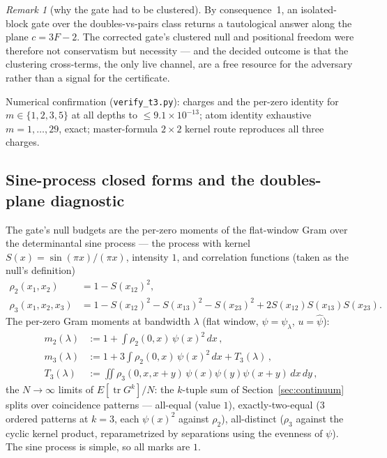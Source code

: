 \documentclass[11pt]{article}
\theoremstyle{plain}
\theoremstyle{definition}
\theoremstyle{remark}
\newtheorem*{remk}{Remark}
\newcommand{\tr}{\operatorname{tr}}
\begin{document}
\begin{remk}[why the gate had to be clustered]
By consequence~1, an isolated-block gate over the doubles-vs-pairs class returns
a tautological answer along the plane $c = 3F - 2$. The corrected gate's
clustered null and positional freedom were therefore not conservatism but
necessity --- and the decided outcome is that the clustering cross-terms, the
only live channel, are a free resource for the adversary rather than a signal for
the certificate.
\end{remk}

Numerical confirmation (\texttt{verify\_t3.py}): charges and the per-zero
identity for $m \in \{1, 2, 3, 5\}$ at all depths to $\le 9.1 \times 10^{-13}$;
atom identity exhaustive $m = 1, \ldots, 29$, exact; master-formula
$2 \times 2$ kernel route reproduces all three charges.

\subsection{Sine-process closed forms and the doubles-plane diagnostic}
\label{sec:sine}

The gate's null budgets are the per-zero moments of the flat-window Gram over the
determinantal sine process --- the process with kernel
$S(x) = \sin(\pi x)/(\pi x)$, intensity $1$, and correlation functions (taken as
the null's definition)
\begin{align*}
  \rho_2(x_1, x_2) &= 1 - S(x_{12})^2,\\
  \rho_3(x_1, x_2, x_3) &= 1 - S(x_{12})^2 - S(x_{13})^2 - S(x_{23})^2
    + 2 S(x_{12}) S(x_{13}) S(x_{23}).
\end{align*}
The per-zero Gram moments at bandwidth $\lambda$ (flat window,
$\psi = \psi_\lambda$, $u = \widehat{\psi}$):
\begin{align*}
  m_2(\lambda) &:= 1 + \int \rho_2(0, x)\, \psi(x)^2\, dx \,,\\
  m_3(\lambda) &:= 1 + 3 \int \rho_2(0, x)\, \psi(x)^2\, dx + T_3(\lambda) \,,\\
  T_3(\lambda) &:= \iint \rho_3(0, x, x + y)\, \psi(x) \psi(y) \psi(x + y)\,
    dx\, dy \,,
\end{align*}
the $N \to \infty$ limits of $E[\tr G^k]/N$: the $k$-tuple sum of
Section~\ref{sec:continuum} splits over coincidence patterns --- all-equal (value
$1$), exactly-two-equal ($3$ ordered patterns at $k = 3$, each $\psi(x)^2$
against $\rho_2$), all-distinct ($\rho_3$ against the cyclic kernel product,
reparametrized by separations using the evenness of $\psi$). The sine process is
simple, so all marks are $1$.
\end{document}
